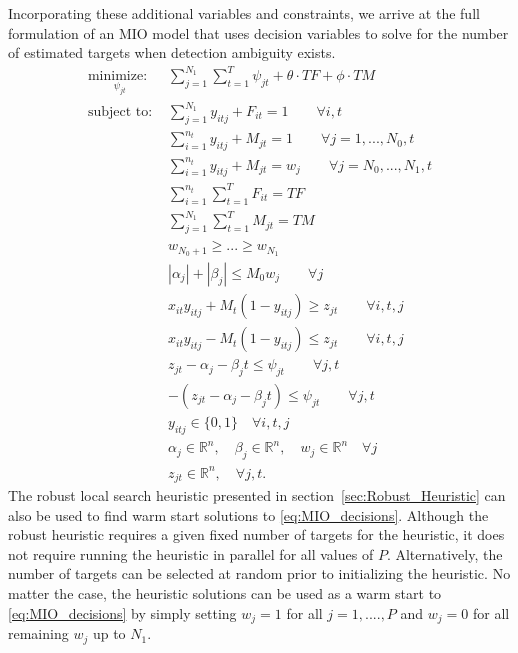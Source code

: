 \vfill
{}
Incorporating these additional variables and constraints, we arrive at the full formulation of an MIO model that uses decision variables to solve for the number of estimated targets when detection ambiguity exists. 
\begin{align}\label{eq:MIO_decisions}
\underset{\psi_{jt}}{\text{minimize: }} & \sum_{j=1}^{N_{1}} \sum_{t=1}^{T} \psi_{jt} + \theta \cdot TF + \phi \cdot TM\\
\text{subject to: }	& \sum_{j=1}^{N_{1}} y_{itj} + F_{it} = 1 \qquad \forall i,t \nonumber\\
				& \sum_{i=1}^{n_{t}} y_{itj} + M_{jt} = 1 \qquad \forall j=1,...,N_{0},t \nonumber \\
				& \sum_{i=1}^{n_{t}} y_{itj} + M_{jt} = w_{j} \qquad \forall j=N_{0},...,N_{1},t \nonumber \\
				& \sum_{i=1}^{n_{t}} \sum_{t=1}^{T} F_{it} = TF \nonumber \\
				& \sum_{j=1}^{N_{1}} \sum_{t=1}^{T} M_{jt} = TM \nonumber \\
				& w_{N_0+1}\geq ...\geq w_{N_1} \nonumber \\
				& |\alpha_{j}|+|\beta_{j}| \leq M_{0}w_{j}\qquad \forall j \nonumber \\
				& x_{it}y_{itj} + M_{t}(1-y_{itj}) \geq z_{jt} \qquad \forall i,t,j \nonumber \\
				& x_{it}y_{itj} - M_{t}(1-y_{itj}) \leq z_{jt} \qquad \forall i,t,j \nonumber \\
				& z_{jt} - \alpha_{j} - \beta_{j}t \leq \psi_{jt} \qquad \forall j,t \nonumber \\
				& -(z_{jt} - \alpha_{j} - \beta_{j}t) \leq \psi_{jt} \qquad \forall j,t \nonumber \\
			 	& y_{itj} \in \{0,1\} \quad \forall i,t,j \nonumber \\
				& \alpha_{j} \in \mathbb{R}^n,\quad \beta_{j} \in \mathbb{R}^n,\quad w_{j} \in \mathbb{R}^n \quad \forall j \nonumber \\
				& z_{jt} \in \mathbb{R}^n, \quad \forall j,t. \nonumber
\end{align}
\vfill
{}
The robust local search heuristic presented in section~\ref{sec:Robust_Heuristic} can also be used to find warm start solutions to \eqref{eq:MIO_decisions}. Although the robust heuristic requires a given fixed number of targets for the heuristic, it does not require running the heuristic in parallel for all values of $P$. Alternatively, the number of targets can be selected at random prior to initializing the heuristic. No matter the case, the heuristic solutions can be used as a warm start to \eqref{eq:MIO_decisions} by simply setting $w_{j}=1$ for all $j=1,....,P$ and $w_{j}=0$ for all remaining $w_{j}$ up to $N_{1}$.